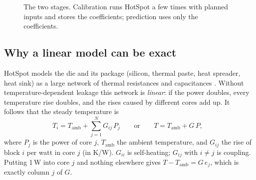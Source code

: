 \documentclass[11pt,a4paper]{article}
\begin{document}
\begin{figure}[H]
\centering
{}
\caption{The two stages. Calibration runs HotSpot a few times with planned inputs and stores the
coefficients; prediction uses only the coefficients.}
\label{fig:pipeline}
\end{figure}

\subsection{Why a linear model can be exact}\label{sec:linear}
HotSpot models the die and its package (silicon, thermal paste, heat spreader, heat sink) as a
large network of thermal resistances and capacitances \cite{skadron03,hotspot}. Without
temperature-dependent leakage this network is \emph{linear}: if the power doubles, every
temperature rise doubles, and the rises caused by different cores add up. It follows that the
steady temperature is
\begin{equation}
  T_i = T_\text{amb} + \sum_{j=1}^{N} G_{ij}\,P_j
  \qquad\text{or}\qquad T = T_\text{amb} + G\,P ,
  \label{eq:s1}
\end{equation}
where $P_j$ is the power of core $j$, $T_\text{amb}$ the ambient temperature, and $G_{ij}$ the
rise of block $i$ per watt in core $j$ (in K/W). $G_{ii}$ is self-heating; $G_{ij}$ with
$i\neq j$ is coupling. Putting 1\,W into core $j$ and nothing elsewhere gives
$T - T_\text{amb} = G\,e_j$, which is exactly column $j$ of $G$.
\end{document}
